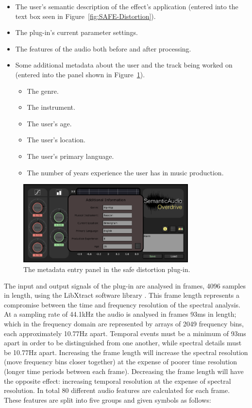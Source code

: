 		\begin{itemize}
			\item The user's semantic description of the effect's application (entered into the text box seen
				in Figure~\ref{fig:SAFE-Distortion}).
			\item The plug-in's current parameter settings.
			\item The features of the audio both before and after processing.
			\item Some additional metadata about the user and the track being worked on (entered into the panel
				shown in Figure~\ref{fig:SAFE-Metadata}).
			\begin{itemize}
				\item The genre.
				\item The instrument.
				\item The user's age.
				\item The user's location.
				\item The user's primary language.
				\item The number of years experience the user has in music production.
			\end{itemize}
		\end{itemize}

		\begin{figure}[h!]
			\centering
			\includegraphics[width=0.8\textwidth]{chapter4/Images/SAFEMetadata.png}
			\caption{The metadata entry panel in the \acrshort{safe} distortion plug-in.}
			\label{fig:SAFE-Metadata}
		\end{figure}

		The input and output signals of the plug-in are analysed in frames, 4096 samples in length, using the
		LibXtract software library \citep{bullock2007libxtract}. This frame length represents a compromise between
		the time and frequency resolution of the spectral analysis. At a sampling rate of 44.1kHz the audio is
		analysed in frames 93ms in length; which in the frequency domain are represented by arrays of 2049
		frequency bins, each approximately 10.77Hz apart. Temporal events must be a minimum of 93ms apart in order
		to be distinguished from one another, while spectral details must be 10.77Hz apart. Increasing the frame
		length will increase the spectral resolution (move frequency bins closer together) at the expense of poorer
		time resolution (longer time periods between each frame).  Decreasing the frame length will have the
		opposite effect: increasing temporal resolution at the expense of spectral resolution. In total 80
		different audio features are calculated for each frame. These features are split into five groups and given
		symbols as follows:

